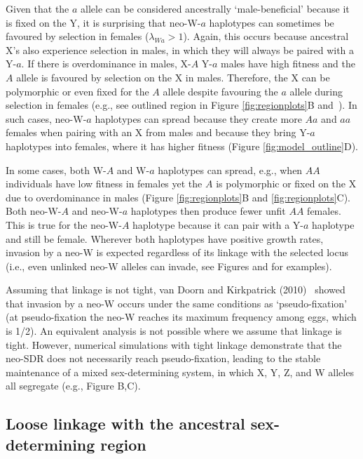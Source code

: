 \documentclass[10pt,letterpaper]{article}
\begin{document}
Given that the $a$ allele can be considered ancestrally `male-beneficial' because it is fixed on the Y, it is surprising that neo-W-$a$ haplotypes can sometimes be favoured by selection in females ($\lambda_{Wa}>1$). 
Again, this occurs because ancestral X's also experience selection in males, in which they will always be paired with a Y-$a$. 
If there is overdominance in males, X-$A$ Y-$a$ males have high fitness and the $A$ allele is favoured by selection on the X in males. 
Therefore, the X can be polymorphic or even fixed for the $A$ allele despite favouring the $a$ allele during selection in females (e.g., see outlined region in Figure \ref{fig:regionplots}B and~\cite{Lloyd1977,Otto2014}). 
In such cases, neo-W-$a$ haplotypes can spread because they create more $Aa$ and $aa$ females when pairing with an X from males and because they bring Y-$a$ haplotypes into females, where it has higher fitness (Figure \ref{fig:model_outline}D). 

In some cases, both W-$A$ and W-$a$ haplotypes can spread, e.g., when $AA$ individuals have low fitness in females yet the $A$ is polymorphic or fixed on the X due to overdominance in males (Figure \ref{fig:regionplots}B and \ref{fig:regionplots}C).
Both neo-W-$A$ and neo-W-$a$ haplotypes then produce fewer unfit $AA$ females.
This is true for the neo-W-$A$ haplotype because it can pair with a Y-$a$ haplotype and still be female. 
Wherever both haplotypes have positive growth rates, invasion by a neo-W is expected regardless of its linkage with the selected locus (i.e., even unlinked neo-W alleles can invade, see Figures  and  for examples). 

Assuming that linkage is not tight, van Doorn and Kirkpatrick (2010)~\cite{vanDoorn:2010hu} showed that invasion by a neo-W occurs under the same conditions as `pseudo-fixation' (at pseudo-fixation the neo-W reaches its maximum frequency among eggs, which is 1/2). 
An equivalent analysis is not possible where we assume that linkage is tight. 
However, numerical simulations with tight linkage demonstrate that the neo-SDR does not necessarily reach pseudo-fixation, leading to the stable maintenance of a mixed sex-determining system, in which X, Y, Z, and W alleles all segregate (e.g., Figure B,C). 


\subsection*{Loose linkage with the ancestral sex-determining region}
\end{document}
